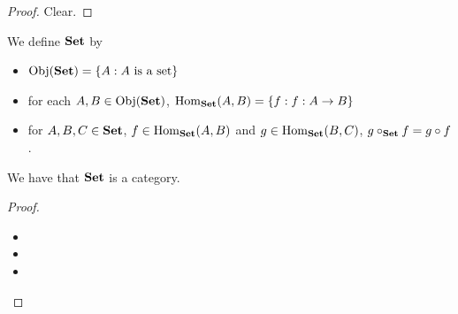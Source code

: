 \documentclass{book}
\begin{document}
	\begin{proof}
		Clear.
	\end{proof}
	
	\begin{defn} 
		We define $\text{\textbf{Set}}$ by  
		\begin{itemize}
			\item $\operatorname{Obj}(\text{\textbf{Set}}) = \{A: A \text{ is a set}\}$ 
			\item for each $A,B \in \operatorname{Obj}(\text{\textbf{Set}})$, $\operatorname{Hom}_{\text{\textbf{Set}}}(A,B) = \{f: f:A \rightarrow B\}$
			\item for $A, B, C \in \text{\textbf{Set}}$, $f \in \operatorname{Hom}_{\text{\textbf{Set}}}(A, B)$ and $g \in \operatorname{Hom}_{\text{\textbf{Set}}}(B, C)$, $g \circ_{\text{\textbf{Set}}} f = g \circ f$. 
		\end{itemize}
	\end{defn}

	\begin{ex} 
		We have that $\text{\textbf{Set}}$ is a category.
	\end{ex}

	\begin{proof}\
		\begin{itemize}
			\item {}
			\item {} 
			\item {} 
		\end{itemize}
	\end{proof}
	
	\begin{ex}
	\end{ex}
	
	\begin{ex}
	\end{ex}
	
	
	
\end{document}
